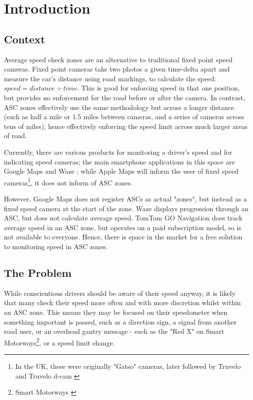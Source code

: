 \documentclass[11pt, a4paper, notitlepage]{report}
\begin{document}
\tableofcontents

\chapter{Introduction}
\section{Context}\label{sec:Context}
Average speed check zones are an alternative to traditional fixed point speed cameras. Fixed point cameras take two photos a given time-delta apart and measure the car's distance using road markings, to calculate the speed: $ speed = distance \div time $. This is good for enforcing speed in that one position, but provides no enforcement for the road before or after the camera. In contrast, ASC zones effectively use the same methodology but across a longer distance (such as half a mile or 1.5 miles between cameras, and a series of cameras across tens of miles); hence effectively enforcing the speed limit across much larger areas of road.

Currently, there are various products for monitoring a driver's speed and for indicating speed cameras; the main smartphone applications in this space are Google Maps \citep{googleMaps} and Waze \citep{waze}; while Apple Maps \citep{appleMaps} will inform the user of fixed speed cameras\footnote{In the UK, these were originally "Gatso" cameras, later followed by Truvelo and Truvelo d-cam \citep{dcam}}, it does not inform of ASC zones.

However, Google Maps does not register ASCs as actual "zones", but instead as a fixed speed camera at the start of the zone. Waze displays progression through an ASC, but does not calculate average speed. TomTom GO Navigation \citep{tomtomGo} does track average speed in an ASC zone, but operates on a paid subscription model, so is not available to everyone. Hence, there is space in the market for a free solution to monitoring speed in ASC zones.
\section{The Problem}
While conscientious drivers should be aware of their speed anyway, it is likely that many check their speed more often and with more discretion whilst within an ASC zone. This means they may be focused on their speedometer when something important is passed, such as a direction sign, a signal from another road user, or an overhead gantry message - such as the "Red X" on Smart Motorways\footnote{Smart Motorways \citep{SmartMotorways}}, or a speed limit change.
\end{document}
